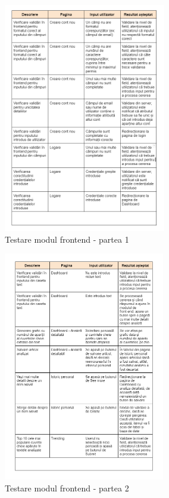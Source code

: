 \begin{figure}[h]
	\centering
	\includegraphics[height=100mm]{figs/testareFE1.png}
    \caption{Testare modul frontend - partea 1}
	\label{fig:testareFE1}
\end{figure}

\begin{figure}[ht]
	\centering
	\includegraphics[height=100mm]{figs/testareFE2.png}
    \caption{Testare modul frontend - partea 2}
	\label{fig:testareFE2}
\end{figure}

